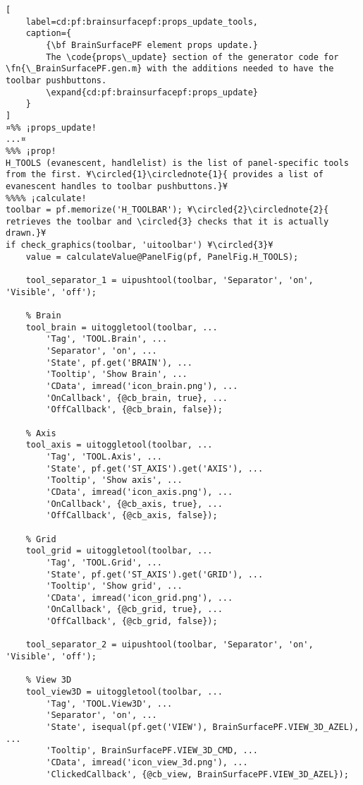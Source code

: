 \documentclass{tufte-handout}
\begin{document}
\begin{lstlisting}[
	label=cd:pf:brainsurfacepf:props_update_tools,
	caption={
		{\bf BrainSurfacePF element props update.}
		The \code{props\_update} section of the generator code for \fn{\_BrainSurfacePF.gen.m} with the additions needed to have the toolbar pushbuttons.
		\expand{cd:pf:brainsurfacepf:props_update}
	}
]
¤%% ¡props_update!
...¤
%%% ¡prop!
H_TOOLS (evanescent, handlelist) is the list of panel-specific tools from the first. ¥\circled{1}\circlednote{1}{ provides a list of evanescent handles to toolbar pushbuttons.}¥
%%%% ¡calculate!
toolbar = pf.memorize('H_TOOLBAR'); ¥\circled{2}\circlednote{2}{ retrieves the toolbar and \circled{3} checks that it is actually drawn.}¥
if check_graphics(toolbar, 'uitoolbar') ¥\circled{3}¥
    value = calculateValue@PanelFig(pf, PanelFig.H_TOOLS);
    
    tool_separator_1 = uipushtool(toolbar, 'Separator', 'on', 'Visible', 'off');

    % Brain
    tool_brain = uitoggletool(toolbar, ...
        'Tag', 'TOOL.Brain', ...
        'Separator', 'on', ...
        'State', pf.get('BRAIN'), ...
        'Tooltip', 'Show Brain', ...
        'CData', imread('icon_brain.png'), ...
        'OnCallback', {@cb_brain, true}, ...
        'OffCallback', {@cb_brain, false});

    % Axis
    tool_axis = uitoggletool(toolbar, ...
        'Tag', 'TOOL.Axis', ...
        'State', pf.get('ST_AXIS').get('AXIS'), ...
        'Tooltip', 'Show axis', ...
        'CData', imread('icon_axis.png'), ...
        'OnCallback', {@cb_axis, true}, ...
        'OffCallback', {@cb_axis, false});

    % Grid
    tool_grid = uitoggletool(toolbar, ...
        'Tag', 'TOOL.Grid', ...
        'State', pf.get('ST_AXIS').get('GRID'), ...
        'Tooltip', 'Show grid', ...
        'CData', imread('icon_grid.png'), ...
        'OnCallback', {@cb_grid, true}, ...
        'OffCallback', {@cb_grid, false});
        
    tool_separator_2 = uipushtool(toolbar, 'Separator', 'on', 'Visible', 'off');

    % View 3D
    tool_view3D = uitoggletool(toolbar, ...
        'Tag', 'TOOL.View3D', ...
        'Separator', 'on', ... 
        'State', isequal(pf.get('VIEW'), BrainSurfacePF.VIEW_3D_AZEL), ...
        'Tooltip', BrainSurfacePF.VIEW_3D_CMD, ...
        'CData', imread('icon_view_3d.png'), ...
        'ClickedCallback', {@cb_view, BrainSurfacePF.VIEW_3D_AZEL});


\end{lstlisting}
\end{document}
